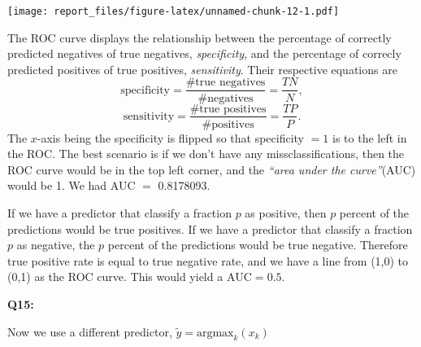 \documentclass[]{article}
\begin{document}
\texttt{[image: report\_files/figure-latex/unnamed-chunk-12-1.pdf]}

The ROC curve displays the relationship between the percentage of
correctly predicted negatives of true negatives, \emph{specificity}, and
the percentage of correcly predicted positives of true positives,
\emph{sensitivity}. Their respective equations are \[
\textrm{specificity} =  \frac{\textrm{#true negatives}}{\textrm{#negatives}} = \frac{TN}{N},
\] \[
\textrm{sensitivity} =  \frac{\textrm{#true positives}}{\textrm{#positives}} = \frac{TP}{P}.
\] The \(x\)-axis being the specificity is flipped so that specificity
\(= 1\) is to the left in the ROC. The best scenario is if we don't have
any missclassifications, then the ROC curve would be in the top left
corner, and the \emph{``area under the curve''}(AUC) would be 1. We had
AUC \(=\) 0.8178093.

If we have a predictor that classify a fraction \(p\) as positive, then
\(p\) percent of the predictions would be true positives. If we have a
predictor that classify a fraction \(p\) as negative, the \(p\) percent
of the predictions would be true negative. Therefore true positive rate
is equal to true negative rate, and we have a line from (1,0) to (0,1)
as the ROC curve. This would yield a \(\textrm{AUC} = 0.5\).

\textbf{Q15:}

Now we use a different predictor,
\(\tilde{y} = \textrm{argmax}_k (x_k)\)
\end{document}
